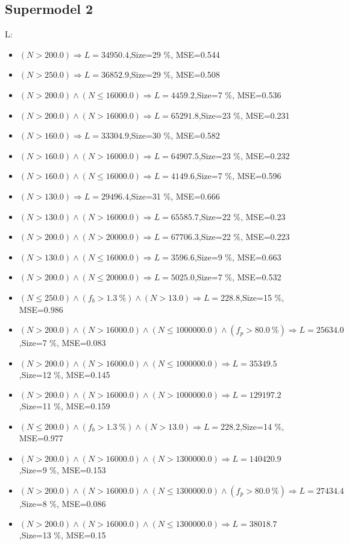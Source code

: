 \documentclass[numbered]{CSL}
\begin{document}
\subsection{Supermodel 2}
L:
\begin{itemize}
\item $(N > 200.0) \Rightarrow L = 34950.4$,\hfill Size=29 \%, MSE=0.544
\item $(N > 250.0) \Rightarrow L = 36852.9$,\hfill Size=29 \%, MSE=0.508
\item $(N > 200.0) \land (N \leq 16000.0) \Rightarrow L = 4459.2$,\hfill Size=7 \%, MSE=0.536
\item $(N > 200.0) \land (N > 16000.0) \Rightarrow L = 65291.8$,\hfill Size=23 \%, MSE=0.231
\item $(N > 160.0) \Rightarrow L = 33304.9$,\hfill Size=30 \%, MSE=0.582
\item $(N > 160.0) \land (N > 16000.0) \Rightarrow L = 64907.5$,\hfill Size=23 \%, MSE=0.232
\item $(N > 160.0) \land (N \leq 16000.0) \Rightarrow L = 4149.6$,\hfill Size=7 \%, MSE=0.596
\item $(N > 130.0) \Rightarrow L = 29496.4$,\hfill Size=31 \%, MSE=0.666
\item $(N > 130.0) \land (N > 16000.0) \Rightarrow L = 65585.7$,\hfill Size=22 \%, MSE=0.23
\item $(N > 200.0) \land (N > 20000.0) \Rightarrow L = 67706.3$,\hfill Size=22 \%, MSE=0.223
\item $(N > 130.0) \land (N \leq 16000.0) \Rightarrow L = 3596.6$,\hfill Size=9 \%, MSE=0.663
\item $(N > 200.0) \land (N \leq 20000.0) \Rightarrow L = 5025.0$,\hfill Size=7 \%, MSE=0.532
\item $(N \leq 250.0) \land (f_b > 1.3~\%) \land (N > 13.0) \Rightarrow L = 228.8$,\hfill Size=15 \%, MSE=0.986
\item $(N > 200.0) \land (N > 16000.0) \land (N \leq 1000000.0) \land (f_p > 80.0~\%) \Rightarrow L = 25634.0$,\hfill Size=7 \%, MSE=0.083
\item $(N > 200.0) \land (N > 16000.0) \land (N \leq 1000000.0) \Rightarrow L = 35349.5$,\hfill Size=12 \%, MSE=0.145
\item $(N > 200.0) \land (N > 16000.0) \land (N > 1000000.0) \Rightarrow L = 129197.2$,\hfill Size=11 \%, MSE=0.159
\item $(N \leq 200.0) \land (f_b > 1.3~\%) \land (N > 13.0) \Rightarrow L = 228.2$,\hfill Size=14 \%, MSE=0.977
\item $(N > 200.0) \land (N > 16000.0) \land (N > 1300000.0) \Rightarrow L = 140420.9$,\hfill Size=9 \%, MSE=0.153
\item $(N > 200.0) \land (N > 16000.0) \land (N \leq 1300000.0) \land (f_p > 80.0~\%) \Rightarrow L = 27434.4$,\hfill Size=8 \%, MSE=0.086
\item $(N > 200.0) \land (N > 16000.0) \land (N \leq 1300000.0) \Rightarrow L = 38018.7$,\hfill Size=13 \%, MSE=0.15
\end{itemize}
\end{document}
